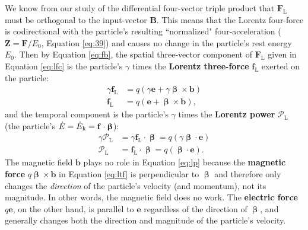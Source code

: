\documentclass[12pt]{article}
\renewcommand{\vv}[1]{\mathbf{#1}}
\newcommand{\vvbeta}{\bm{\upbeta}}
\begin{document}
We know from our study of the differential four-vector triple product that $\vv F_{\mathrm{L}}$ must be orthogonal to the input-vector $\vv B$. This means that the Lorentz four-force is codirectional with the particle's resulting ``normalized" four-acceleration ($\vv Z =  \vv F / E_0$, Equation \ref{eq:39}) and causes no change in the particle's rest energy $E_0$. Then by Equation \ref{eq:fb}, the spatial three-vector component of $\vv F_{\textrm{L}}$ given in Equation \ref{eq:lfc} is the particle's $\gamma$ times the \textbf{Lorentz three-force} $\vv f_{\textrm{L}}$ exerted on the particle:
\begin{equation}\label{eq:ltf}
\begin{split}
\gamma \vv f_{\textrm{L}} &= q ( \gamma \vv e + \gamma \vvbeta \times \vv b ) \\
\vv f_{\textrm{L}} &= q ( \vv e + \vvbeta \times \vv b ),
\end{split}
\end{equation}
and the temporal component is the particle's $\gamma$ times the \textbf{Lorentz power} $\mathcal{P}_{\textrm{L}}$ (the particle's $\dot{E} = \dot{E}_{\mkern.5mu \textrm{k}} = \vv f \cdot \vvbeta$):
\begin{equation}\label{eq:lp}
\begin{split}
\gamma \mathcal{P}_{\textrm{L}} &= \gamma \vv f_{\textrm{L}} \cdot \vvbeta  = q ( \gamma \vvbeta \cdot \vv e ) \\
\mathcal{P}_{\textrm{L}} &= \vv f_{\textrm{L}} \cdot \vvbeta = q ( \vvbeta \cdot \vv e ) .
\end{split}
\end{equation}
The magnetic field $\vv b$ plays no role in Equation \ref{eq:lp} because the \textbf{magnetic force} $q \vvbeta \times \vv b$ in Equation \ref{eq:ltf} is perpendicular to $\vvbeta$ and therefore only changes the \emph{direction} of the particle's velocity (and momentum), not its magnitude. In other words, the magnetic field does no work. The \textbf{electric force} $q \vv e$, on the other hand, is parallel to $\vv e$ regardless of the direction of $\vvbeta$, and generally changes both the direction and magnitude of the particle's velocity.
\end{document}
